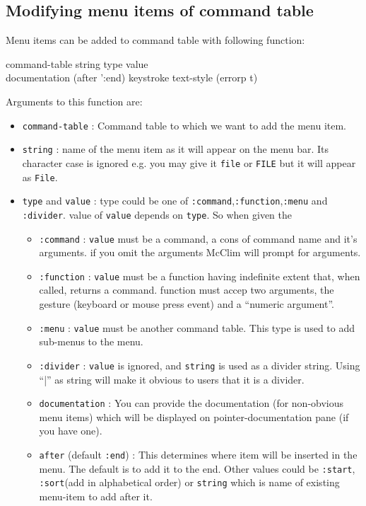 \subsection{Modifying menu items of command table}
\label{modifying-menu-items}

Menu items can be added to command table with following function:

 {command-table string type value
  \\\key documentation (after ':end) keystroke text-style (errorp t)}

Arguments to this function are:
\begin{itemize}
\item
  \texttt{command-table} : Command table to which we want to add the menu item.
\item
  \texttt{string} : name of the menu item as it will appear on the menu bar. Its character case is ignored e.g. you may give it \texttt{file} or \texttt{FILE} but it will appear as \texttt{File}.
\item
  \texttt{type} and \texttt{value} : type could be one of \texttt{:command},\texttt{:function},\texttt{:menu} and \texttt{:divider}. value of \texttt{value} depends on \texttt{type}. So when given the 
  \begin{itemize}
  \item
    \texttt{:command} : \texttt{value} must be a command, a cons of command name and it's arguments. if you omit the arguments McClim will prompt for arguments.
  \item
    \texttt{:function} : \texttt{value} must be a function having indefinite extent that, when called, returns a command. function must accep two arguments, the gesture (keyboard or mouse press event) and a ``numeric argument''.
  \item
    \texttt{:menu} : \texttt{value} must be another command table. This type is used to add sub-menus to the menu.
  \item
    \texttt{:divider} : \texttt{value} is ignored, and \texttt{string} is used as a divider string. Using ``|'' as string will make it obvious to users that it is a divider.
  \item
    \texttt{documentation} : You can provide the documentation (for non-obvious menu items) which will be displayed on pointer-documentation pane (if you have one).
  \item
    \texttt{after} (default \texttt{:end}) : This determines where item will be inserted in the menu. The default is to add it to the end. Other values could be \texttt{:start}, \texttt{:sort}(add in alphabetical order) or \texttt{string} which is name of existing menu-item to add after it.

\end{itemize}
\end{itemize}
